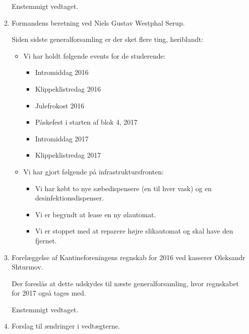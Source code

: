 \documentclass[a4paper]{article}
\begin{document}
\begin{enumerate}
Enstemmigt vedtaget.


\item[\textsection 5] Formandens beretning ved Niels Gustav Westphal Serup.

Siden sidste generalforsamling er der sket flere ting, heriblandt:
\begin{itemize}

\item Vi har holdt følgende events for de studerende:
\begin{itemize}
\item Intromiddag 2016
\item Klippeklistredag 2016
\item Julefrokost 2016
\item Påskefest i starten af blok 4, 2017 
\item Intromiddag 2017
\item Klippeklistredag 2017
\end{itemize}

\item Vi har gjort følgende på infrastruktursfronten:
\begin{itemize}
\item Vi har købt to nye sæbedispensere (en til hver vask) og en
desinfektionsdispenser.
\item Vi er begyndt at lease en ny ølautomat.
\item Vi er stoppet med at reparere højre slikautomat og skal have den fjernet.
\end{itemize}

\end{itemize}


\item[\textsection 6] Forelæggelse af Kantineforeningens regnskab for 2016 ved
kasserer Oleksandr Shturmov.

Der foreslås at dette udskydes til næste generalforsamling, hvor regnskabet for
2017 også tages med.

Enstemmigt vedtaget.


\item[\textsection 7] Forslag til ændringer i vedtægterne.


\end{enumerate}
\end{document}
